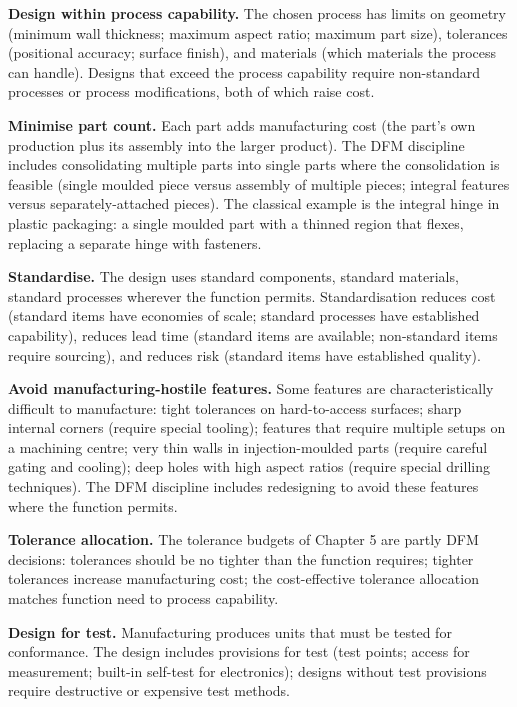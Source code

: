 \textbf{Design within process capability.} The chosen process has limits on geometry (minimum wall thickness; maximum aspect ratio; maximum part size), tolerances (positional accuracy; surface finish), and materials (which materials the process can handle). Designs that exceed the process capability require non-standard processes or process modifications, both of which raise cost.

\textbf{Minimise part count.} Each part adds manufacturing cost (the part's own production plus its assembly into the larger product). The DFM discipline includes consolidating multiple parts into single parts where the consolidation is feasible (single moulded piece versus assembly of multiple pieces; integral features versus separately-attached pieces). The classical example is the integral hinge in plastic packaging: a single moulded part with a thinned region that flexes, replacing a separate hinge with fasteners.

\textbf{Standardise.} The design uses standard components, standard materials, standard processes wherever the function permits. Standardisation reduces cost (standard items have economies of scale; standard processes have established capability), reduces lead time (standard items are available; non-standard items require sourcing), and reduces risk (standard items have established quality).

\textbf{Avoid manufacturing-hostile features.} Some features are characteristically difficult to manufacture: tight tolerances on hard-to-access surfaces; sharp internal corners (require special tooling); features that require multiple setups on a machining centre; very thin walls in injection-moulded parts (require careful gating and cooling); deep holes with high aspect ratios (require special drilling techniques). The DFM discipline includes redesigning to avoid these features where the function permits.

\textbf{Tolerance allocation.} The tolerance budgets of Chapter 5 are partly DFM decisions: tolerances should be no tighter than the function requires; tighter tolerances increase manufacturing cost; the cost-effective tolerance allocation matches function need to process capability.

\textbf{Design for test.} Manufacturing produces units that must be tested for conformance. The design includes provisions for test (test points; access for measurement; built-in self-test for electronics); designs without test provisions require destructive or expensive test methods.

